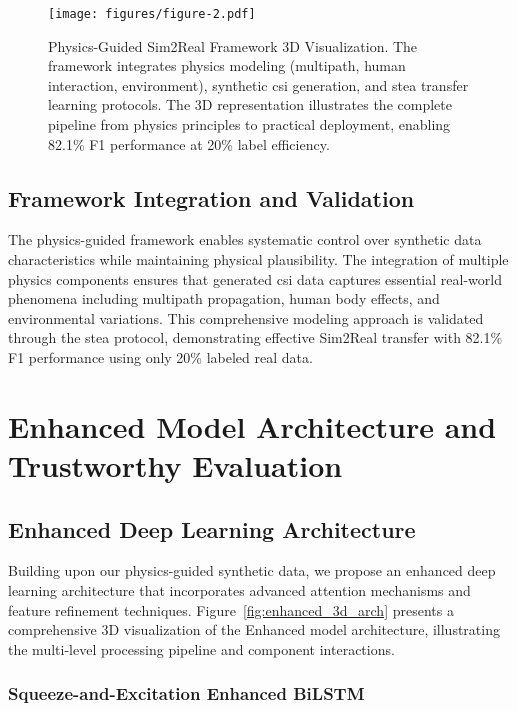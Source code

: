 \documentclass[journal]{IEEEtran}
\begin{document}
\begin{figure}[ht]
\centering
\texttt{[image: figures/figure-2.pdf]}%
\caption{Physics-Guided Sim2Real Framework 3D Visualization. The framework integrates physics modeling (multipath, human interaction, environment), synthetic \gls{csi} generation, and \gls{stea} transfer learning protocols. The 3D representation illustrates the complete pipeline from physics principles to practical deployment, enabling 82.1\% F1 performance at 20\% label efficiency.}
\label{fig:physics_3d_framework}
\end{figure}

\subsection{Framework Integration and Validation}

The physics-guided framework enables systematic control over synthetic data characteristics while maintaining physical plausibility. The integration of multiple physics components ensures that generated \gls{csi} data captures essential real-world phenomena including multipath propagation, human body effects, and environmental variations. This comprehensive modeling approach is validated through the \gls{stea} protocol, demonstrating effective Sim2Real transfer with 82.1\% F1 performance using only 20\% labeled real data.

\section{Enhanced Model Architecture and Trustworthy Evaluation}

\subsection{Enhanced Deep Learning Architecture}

Building upon our physics-guided synthetic data, we propose an enhanced deep learning architecture that incorporates advanced attention mechanisms and feature refinement techniques. Figure~\ref{fig:enhanced_3d_arch} presents a comprehensive 3D visualization of the Enhanced model architecture, illustrating the multi-level processing pipeline and component interactions.

\subsubsection{Squeeze-and-Excitation Enhanced BiLSTM}
\end{document}
